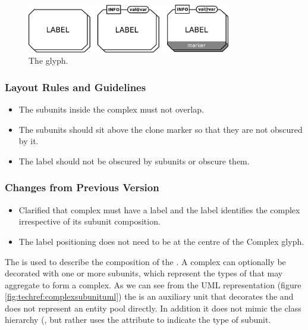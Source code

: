 \begin{figure}[htb]
  \centering
  \includegraphics[width = 3.5in]{images/complexMultimerGlyph}
  \caption{The  glyph.}
  \label{fig:techref:complexMultimer}
\end{figure}

\subsubsection{Layout Rules and Guidelines}

\begin{itemize}
\item The subunits inside the complex must not overlap.
\item The subunits should sit above the clone marker so that they are
  not obscured by it.
\item The label should not be obscured by subunits or obscure them.
\end{itemize}


\subsubsection{Changes from Previous Version}

\begin{itemize}
\item Clarified that complex must have a label and the label
  identifies the complex irrespective of its subunit composition.
\item The label positioning does not need to be at the centre of the
  Complex glyph.
\end{itemize}

\label{defn:Subunit}\label{sec:techref:subunits}

The  is used to describe the composition of the
. A complex can optionally be decorated with one or
more subunits, which represent the types of 
that may aggregate to form a complex. As we can see from the UML
representation (figure \ref{fig:techref:complexsubunituml}) the
 is an auxiliary unit that decorates the
 and does not represent an entity pool directly. In
addition it does not mimic the  class
hierarchy (, but rather uses the
 attribute to indicate the type of subunit.


